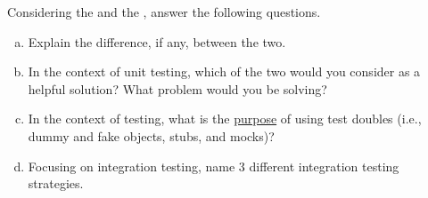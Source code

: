 
\pgfmathsetmacro{}

Considering the  and the , answer the following questions.

\begin{enumerate}[a.]

	\item {} Explain the difference, if any, between the two.
		\ifdefined\questionSevenAnswerA
		  \newline\answer\questionSevenAnswerA
		\else
		  \\
		\fi





	\item {} In the context of unit testing, which of the two would you consider as a helpful solution? What problem would you be solving?
		\ifdefined\questionSevenAnswerB
		  \newline\answer\questionSevenAnswerB
		\else
		  \\
		\fi





	\item {} In the context of testing, what is the \underline{purpose} of using test doubles (i.e., dummy and fake objects, stubs, and mocks)?
		\ifdefined\questionSevenAnswerC
		  \newline\answer\questionSevenAnswerC
		\else
		  \\
		\fi





	\item {} Focusing on integration testing, name 3 different integration testing strategies.
		\ifdefined\questionSevenAnswerD
		  \newline\answer\questionSevenAnswerD
		\else
		  \\
		\fi

\end{enumerate}
